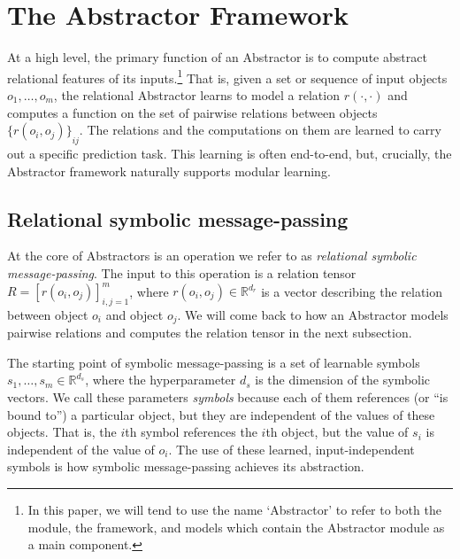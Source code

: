 
\def\m{m}


\section{The Abstractor Framework}
\label{sec:abstractor_framework}

At a high level, the primary function of an Abstractor is to compute abstract relational features of its
inputs.\footnote{In this paper, we will tend to use the name `Abstractor' to refer to both the module, the framework, and models which contain the Abstractor module as a main component.} That is, given a set or sequence of input objects $o_1, \ldots, o_\m$, the relational Abstractor learns to model a relation $r(\cdot, \cdot)$ and computes a function on
the set of pairwise relations between objects ${\{ r(o_i, o_j) \}}_{ij}$. The relations and the computations on them are learned to carry out a specific prediction task. This learning is often end-to-end, but, crucially, the Abstractor framework naturally supports modular learning.
\subsection{Relational symbolic message-passing}
\label{ssec:message_passing}

At the core of Abstractors is an operation we refer to as \textit{relational symbolic message-passing}.
The input to this operation is a relation tensor $R = \left[r(o_i, o_j)\right]_{i,j=1}^\m$, where $r(o_i, o_j) \in \mathbb{R}^{d_r}$ is a vector describing the relation between object $o_i$ and object $o_j$. We will come back to how an Abstractor models pairwise relations and computes the relation tensor in the next subsection.

The starting point of symbolic message-passing is a set of learnable symbols $s_1, \ldots, s_\m \in \mathbb{R}^{d_s}$, where the hyperparameter $d_s$ is the dimension of the symbolic vectors. We call these parameters \textit{symbols} because each of them references (or ``is bound to'') a particular object, but they are independent of the values of these objects. That is, the $i$th symbol references the $i$th object, but the value of $s_i$ is independent of the value of $o_i$. The use of these learned, input-independent symbols is how symbolic message-passing achieves its abstraction.


